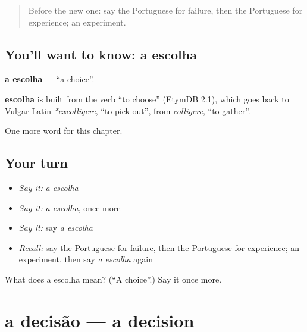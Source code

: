 \label{lesson:PT-C247-escolha}



\begin{quote}
Before the new one: say the Portuguese for failure, then the Portuguese for experience; an experiment.
\end{quote}

\subsection*{You'll want to know: a escolha}
\textbf{a escolha} — \textquotedblleft{}a choice\textquotedblright{}.

\begin{cousinweb}
\textbf{escolha} is built from the verb \textquotedblleft{}to choose\textquotedblright{} (EtymDB 2.1), which goes back to Vulgar Latin \emph{*excolligere}, \textquotedblleft{}to pick out\textquotedblright{}, from \emph{colligere}, \textquotedblleft{}to gather\textquotedblright{}.
\end{cousinweb}

\begin{grammarlens}[title={What you've built}]
One more word for this chapter.
\end{grammarlens}

\subsection*{Your turn}
\begin{itemize}
\raggedright
  \item \emph{Say it:} \emph{a escolha}
  \item \emph{Say it:} \emph{a escolha}, once more
  \item \emph{Say it:} say \emph{a escolha}
  \item \emph{Recall:} say the Portuguese for failure, then the Portuguese for experience; an experiment, then say \emph{a escolha} again
\end{itemize}

\begin{tcolorbox}[breakable,colback=teal!4,colframe=teal!35!black,title={Before you move on}]
What does a escolha mean? (\textquotedblleft{}A choice\textquotedblright{}.) Say it once more.
\end{tcolorbox}
\section[a decisão]{a decisão — a decision}

